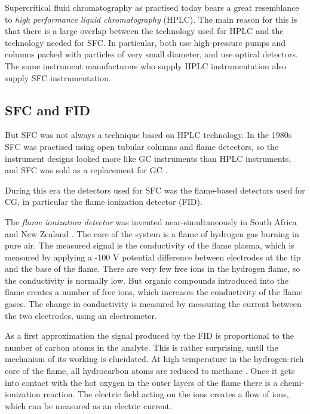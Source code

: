 Supercritical fluid chromatography as practised today bears a great resemblance
to \textit{high performance liquid chromatography} (HPLC). The main reason for
this is that there is a large overlap between the technology used for HPLC and
the technology needed for SFC. In particular, both use high-pressure pumps and
columns packed with particles of very small diameter, and use optical
detectors. The same instrument manufacturers who supply HPLC instrumentation
also supply SFC instrumentation.

\subsection{SFC and FID}

But SFC was not always a technique based on HPLC technology. In the 1980s SFC
was practised using open tubular columns and flame detectors, so the instrument
designs looked more like GC instruments than HPLC instruments, and SFC was sold
as a replacement for GC \autocite{Poole2003}.

During this era the detectors used for SFC was the flame-based detectors used
for CG, in particular the flame ionization detector (FID).

The \textit{flame ionization detector} was invented near-simultaneously in South
Africa and New Zealand \autocite{Ettre2008}. The core of the system is a
flame of hydrogen gas burning in pure air. The measured signal is the conductivity of
the flame plasma, which is measured by applying a {-100} V potential difference
between electrodes at the tip and the base of the flame. There are very few free
ions in the hydrogen flame, so the conductivity is normally low. But organic
compounds introduced into the flame creates a number of free ions, which
increases the conductivity of the flame gases. The change in conductivity is
measured by measuring the current between the two electrodes, using an electrometer. 

As a first approximation the signal produced by the FID is proportional to the
number of carbon atoms in the analyte. This is rather surprising, until the
mechanism of its working is elucidated. At high temperature in the hydrogen-rich
core of the flame, all hydrocarbon atoms are reduced to methane
\autocite{Holm1996}. Once it gets into contact with the hot oxygen in the outer
layers of the flame there is a chemi-ionization reaction. The electric field
acting on the ions creates a flow of ions, which can be measured as an electric
current.

